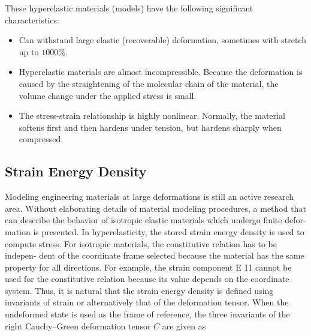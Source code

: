 These hyperelastic materials (models) have the following significant characteristics:
\begin{itemize}
    \item Can withstand large elastic (recoverable) deformation, sometimes with stretch up to $1000\%$.
    \item Hyperelastic materials are almost incompressible. Because the deformation is caused by the straightening of the molecular chain of the material, the volume change under the applied stress is small.
    \item The stress-strain relationship is highly nonlinear. Normally, the material softens first and then hardens under tension, but hardens sharply when compressed.
\end{itemize}
\subsection{Strain Energy Density}
Modeling engineering materials at large deformations is still an active research
area. Without elaborating details of material modeling procedures, a method that
can describe the behavior of isotropic elastic materials which undergo ﬁnite defor-
mation is presented. In hyperelasticity, the stored strain energy density is used to
compute stress. For isotropic materials, the constitutive relation has to be indepen-
dent of the coordinate frame selected because the material has the same property for
all directions. For example, the strain component E 11 cannot be used for the
constitutive relation because its value depends on the coordinate system. Thus, it
is natural that the strain energy density is deﬁned using invariants of strain or
alternatively that of the deformation tensor. When the undeformed state is used as
the frame of reference, the three invariants of the right Cauchy–Green deformation
tensor $C$ are given as
